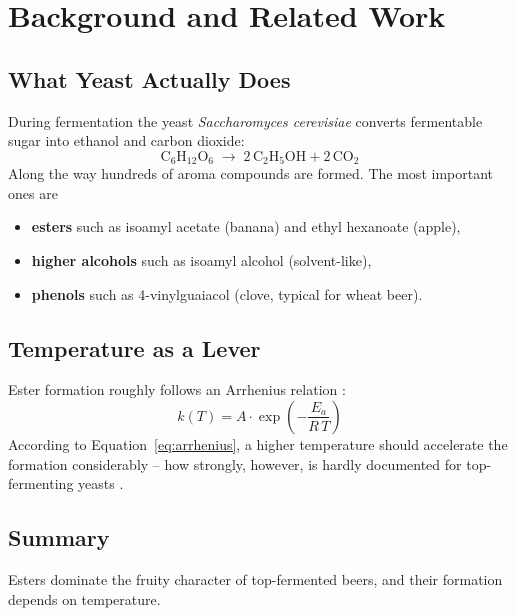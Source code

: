 \chapter{Background and Related Work}
\label{cha:background}

\section{What Yeast Actually Does}
During fermentation the yeast \emph{Saccharomyces cerevisiae} converts fermentable sugar into
ethanol and carbon dioxide:
\begin{equation}
  \mathrm{C_6H_{12}O_6} \;\longrightarrow\; 2\,\mathrm{C_2H_5OH} + 2\,\mathrm{CO_2}
  \label{eq:fermentation}
\end{equation}
Along the way hundreds of aroma compounds are formed. The most important ones are
\begin{itemize}
  \item \textbf{esters} such as isoamyl acetate (banana) and ethyl hexanoate (apple),
  \item \textbf{higher alcohols} such as isoamyl alcohol (solvent-like),
  \item \textbf{phenols} such as 4-vinylguaiacol (clove, typical for wheat beer).
\end{itemize}

\section{Temperature as a Lever}
Ester formation roughly follows an Arrhenius relation \citep{gerstner2020kinetik}:
\begin{equation}
  k(T) = A \cdot \exp\!\left(-\frac{E_a}{R\,T}\right)
  \label{eq:arrhenius}
\end{equation}
According to Equation~\ref{eq:arrhenius}, a higher temperature should accelerate the formation
considerably -- how strongly, however, is hardly documented for top-fermenting yeasts
\citep{malz2021ester, hefeling2018obergaerig}.

\section{Summary}
Esters dominate the fruity character of top-fermented beers, and their formation depends on
temperature.
